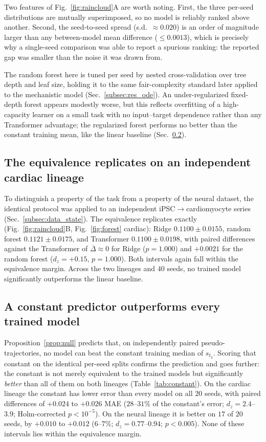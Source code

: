 \documentclass[pdflatex,sn-mathphys-num]{sn-jnl}
\theoremstyle{thmstyleone}%
\theoremstyle{thmstyletwo}%
\theoremstyle{thmstylethree}%
\begin{document}
Two features of Fig.~\ref{fig:raincloud}A are worth noting. First, the three per-seed distributions are mutually superimposed, so no model is reliably ranked above another. Second, the seed-to-seed spread (s.d.\ $\approx 0.020$) is an order of magnitude larger than any between-model mean difference ($\le 0.0013$), which is precisely why a single-seed comparison was able to report a spurious ranking: the reported gap was smaller than the noise it was drawn from.

The random forest here is tuned per seed by nested cross-validation over tree depth and leaf size, holding it to the same fair-complexity standard later applied to the mechanistic model (Sec.~\ref{subsec:res_ode}). An under-regularized fixed-depth forest appears modestly worse, but this reflects overfitting of a high-capacity learner on a small task with no input--target dependence rather than any Transformer advantage; the regularized forest performs no better than the constant training mean, like the linear baseline (Sec.~\ref{subsec:res_constant}).

\subsection{\textbf{The equivalence replicates on an independent cardiac lineage}}
\label{subsec:res_cardiac}

To distinguish a property of the task from a property of the neural dataset, the identical protocol was applied to an independent iPSC$\rightarrow$cardiomyocyte series (Sec.~\ref{subsec:data_state}). The equivalence replicates exactly (Fig.~\ref{fig:raincloud}B, Fig.~\ref{fig:forest} cardiac): Ridge $0.1100\pm0.0155$, random forest $0.1121\pm0.0175$, and Transformer $0.1100\pm0.0198$, with paired differences against the Transformer of $\overline{\Delta}\approx0$ for Ridge ($p=1.000$) and $+0.0021$ for the random forest ($d_z=+0.15$, $p=1.000$). Both intervals again fall within the equivalence margin. Across the two lineages and $40$ seeds, no trained model significantly outperforms the linear baseline.

\subsection{\textbf{A constant predictor outperforms every trained model}}
\label{subsec:res_constant}

Proposition~\ref{prop:null} predicts that, on independently paired pseudo-trajectories, no model can beat the constant training median of $s_{t_2}$. Scoring that constant on the identical per-seed splits confirms the prediction and goes further: the constant is not merely equivalent to the trained models but significantly \emph{better} than all of them on both lineages (Table~\ref{tab:constant}). On the cardiac lineage the constant has lower error than every model on all $20$ seeds, with paired differences of $+0.024$ to $+0.026$ MAE ($28$--$31\%$ of the constant's error; $d_z=2.4$--$3.9$; Holm-corrected $p<10^{-5}$). On the neural lineage it is better on $17$ of $20$ seeds, by $+0.010$ to $+0.012$ ($6$--$7\%$; $d_z=0.77$--$0.94$; $p<0.005$). None of these intervals lies within the equivalence margin.
\end{document}
